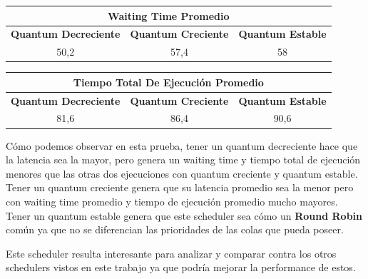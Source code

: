 \begin{center}
	\begin{tabular}{|c|c|c|}
		\hline
		\multicolumn{3}{|c|}{\large{\textbf{Waiting Time Promedio}}} \\
		\hline
		\textbf{Quantum Decreciente} & \textbf{Quantum Creciente} & \textbf{Quantum Estable} \\
		\hline
		50,2 & 57,4 & 58 \\
		\hline
	\end{tabular}
\end{center}

\begin{center}
	\begin{tabular}{|c|c|c|}
		\hline
		\multicolumn{3}{|c|}{\large{\textbf{Tiempo Total De Ejecución Promedio}}} \\
		\hline
		\textbf{Quantum Decreciente} & \textbf{Quantum Creciente} & \textbf{Quantum Estable} \\
		\hline
		81,6 & 86,4 & 90,6 \\
		\hline
	\end{tabular}
\end{center}

Cómo podemos observar en esta prueba, tener un quantum decreciente hace que la latencia sea la mayor, pero genera un waiting time y tiempo total de ejecución menores que las otras dos ejecuciones con quantum creciente y quantum estable. Tener un quantum creciente genera que su latencia promedio sea la menor pero con waiting time promedio y tiempo de ejecución promedio mucho mayores. Tener un quantum estable genera que este scheduler sea cómo un \textbf{Round Robin} común ya que no se diferencian las prioridades de las colas que pueda poseer.

Este scheduler resulta interesante para analizar y comparar contra los otros schedulers vistos en este trabajo ya que podría mejorar la performance de estos. 
